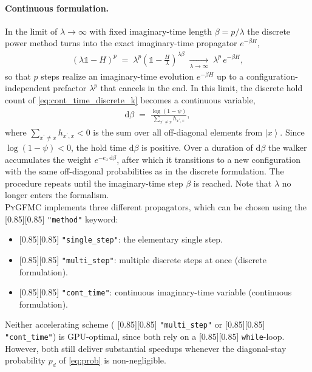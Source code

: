 \documentclass{SciPost}
\newcommand{\pyinline}[1]{\begingroup\setlength{\fboxsep}{0pt}%
  \colorbox{gray!15}{\raisebox{0pt}[0.85\ht\strutbox][0.85\dp\strutbox]{%
    \hspace{1pt}\lstinline{#1}\hspace{1pt}}}\endgroup}
\providecommand{\ket}[1]{\left|#1\right\rangle}
\providecommand{\PyGFMC}{\textsc{PyGFMC}}
\begin{document}
\paragraph{Continuous formulation.} In the limit of $\lambda \to \infty$ with fixed imaginary-time length $\beta = p/\lambda$ the discrete power method turns into the exact imaginary-time propagator $e^{-\beta H}$,
\begin{align}
	(\lambda\mathbb{1} - H)^p
	  \;=\; \lambda^p \left(\mathbb{1} - \tfrac{H}{\lambda}\right)^{\lambda\beta}
	  \;\xrightarrow[\lambda \to \infty]{}\;
	\lambda^p\,e^{-\beta H},
	\label{eq:cont_time_limit}
\end{align}
so that $p$ steps realize an imaginary-time evolution $e^{-\beta H}$ up to a configuration-independent prefactor $\lambda^p$ that cancels in the end.
%
In this limit, the discrete hold count of \autoref{eq:cont_time_discrete_k} becomes a continuous variable,
\begin{align}
	\mathrm{d}\beta \;=\; \frac{\log(1-\psi)}{\,\sum_{x^\prime\neq x}h_{x^\prime,x}\,},
	\label{eq:cont_time_tau}
\end{align}
where $\sum_{x^\prime\neq x}h_{x^\prime,x} < 0$ is the sum over all off-diagonal elements from $\ket{x}$.
%
Since $\log(1-\psi) < 0$, the hold time $\mathrm{d}\beta$ is positive.
%
Over a duration of $\mathrm{d}\beta$ the walker accumulates the weight $e^{-e_{x}\,\mathrm{d}\beta}$, after which it transitions to a new configuration with the same off-diagonal probabilities as in the discrete formulation.
%
The procedure repeats until the imaginary-time step $\beta$ is reached.
%
Note that $\lambda$ no longer enters the formalism.\\

\noindent\PyGFMC{} implements three different propagators, which can be chosen using the \pyinline{"method"} keyword:
\begin{itemize}
	\item \pyinline{"single_step"}: the elementary single step.
	\item \pyinline{"multi_step"}: multiple discrete steps at once (discrete formulation).
	\item \pyinline{"cont_time"}: continuous imaginary-time variable (continuous formulation).
\end{itemize}
Neither accelerating scheme (\pyinline{"multi_step"} or \pyinline{"cont_time"}) is GPU-optimal, since both rely on a \pyinline{while}-loop.
%
However, both still deliver substantial speedups whenever the diagonal-stay probability $p_d$ of \autoref{eq:prob} is non-negligible.
\end{document}
